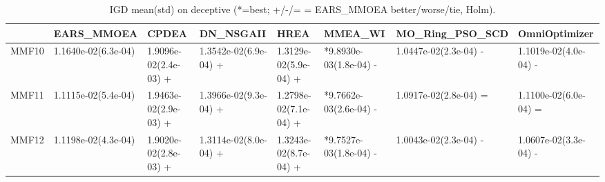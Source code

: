 \begin{table}[t]
\centering
\caption{IGD mean(std) on deceptive (*=best; +/-/= = EARS_MMOEA better/worse/tie, Holm).}
\label{tab:deceptive_IGD}
\begin{tabular}{llllllll}
\toprule
 & EARS\_MMOEA & CPDEA & DN\_NSGAII & HREA & MMEA\_WI & MO\_Ring\_PSO\_SCD & OmniOptimizer \\
\midrule
MMF10 & 1.1640e-02(6.3e-04) & 1.9096e-02(2.4e-03) + & 1.3542e-02(6.9e-04) + & 1.3129e-02(5.9e-04) + & *9.8930e-03(1.8e-04) - & 1.0447e-02(2.3e-04) - & 1.1019e-02(4.0e-04) - \\
MMF11 & 1.1115e-02(5.4e-04) & 1.9463e-02(2.9e-03) + & 1.3966e-02(9.3e-04) + & 1.2798e-02(7.1e-04) + & *9.7662e-03(2.6e-04) - & 1.0917e-02(2.8e-04) = & 1.1100e-02(6.0e-04) = \\
MMF12 & 1.1198e-02(4.3e-04) & 1.9020e-02(2.8e-03) + & 1.3114e-02(8.0e-04) + & 1.3243e-02(8.7e-04) + & *9.7527e-03(1.8e-04) - & 1.0043e-02(2.3e-04) - & 1.0607e-02(3.3e-04) - \\
\bottomrule
\end{tabular}
\end{table}
